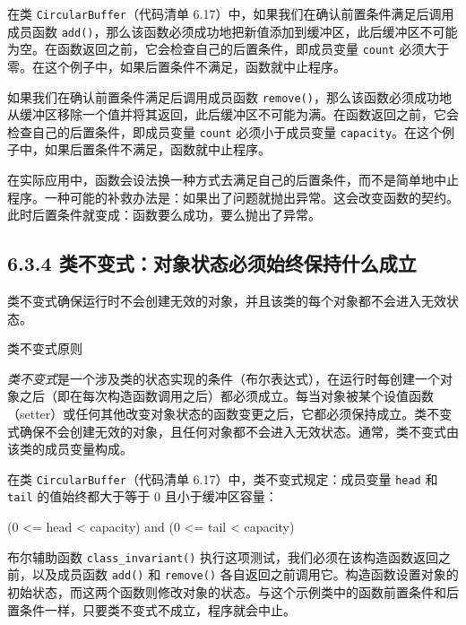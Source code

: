 在类 \texttt{Circular\allowbreak{}Buffer}（代码清单 6.17）中，如果我们在确认前置条件满足后调用成员函数 \texttt{add()}，那么该函数必须成功地把新值添加到缓冲区，此后缓冲区不可能为空。在函数返回之前，它会检查自己的后置条件，即成员变量 \texttt{count} 必须大于零。在这个例子中，如果后置条件不满足，函数就中止程序。

如果我们在确认前置条件满足后调用成员函数 \texttt{remove()}，那么该函数必须成功地从缓冲区移除一个值并将其返回，此后缓冲区不可能为满。在函数返回之前，它会检查自己的后置条件，即成员变量 \texttt{count} 必须小于成员变量 \texttt{capacity}。在这个例子中，如果后置条件不满足，函数就中止程序。

在实际应用中，函数会设法换一种方式去满足自己的后置条件，而不是简单地中止程序。一种可能的补救办法是：如果出了问题就抛出异常。这会改变函数的契约。此时后置条件就变成：函数要么成功，要么抛出了异常。


\subsection{6.3.4 类不变式：对象状态必须始终保持什么成立}

类不变式确保运行时不会创建无效的对象，并且该类的每个对象都不会进入无效状态。

\begin{mySidebar}{类不变式原则}

\emph{类不变式}是一个涉及类的状态实现的条件（布尔表达式），在运行时每创建一个对象之后（即在每次构造函数调用之后）都必须成立。每当对象被某个设值函数（setter）或任何其他改变对象状态的函数变更之后，它都必须保持成立。类不变式确保不会创建无效的对象，且任何对象都不会进入无效状态。通常，类不变式由该类的成员变量构成。
\end{mySidebar}

在类 \texttt{Circular\allowbreak{}Buffer}（代码清单 6.17）中，类不变式规定：成员变量 \texttt{head} 和 \texttt{tail} 的值始终都大于等于 0 且小于缓冲区容量：

\begin{codebox}
(0 <= head < capacity) and (0 <= tail < capacity)
\end{codebox}

布尔辅助函数 \texttt{class\_\allowbreak{}invariant(\allowbreak{})\allowbreak{}} 执行这项测试，我们必须在该构造函数返回之前，以及成员函数 \texttt{add()} 和 \texttt{remove()} 各自返回之前调用它。构造函数设置对象的初始状态，而这两个函数则修改对象的状态。与这个示例类中的函数前置条件和后置条件一样，只要类不变式不成立，程序就会中止。


